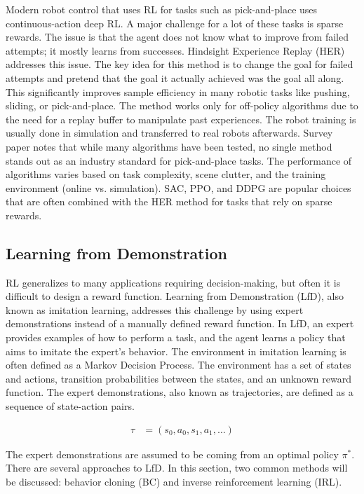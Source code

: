 \noindent
Modern robot control that uses RL for tasks such as pick-and-place uses continuous-action deep RL. A major challenge for a lot of these tasks is sparse rewards. The issue is that the agent does not know what to improve from failed attempts; it mostly learns from successes. Hindsight Experience Replay (HER) \cite{andrychowicz2018hindsightexperiencereplay} addresses this issue. The key idea for this method is to change the goal for failed attempts and pretend that the goal it actually achieved was the goal all along. This significantly improves sample efficiency in many robotic tasks like pushing, sliding, or pick-and-place. The method works only for off-policy algorithms due to the need for a replay buffer to manipulate past experiences. The robot training is usually done in simulation and transferred to real robots afterwards. Survey paper \cite{robotics10030105} notes that while many algorithms have been tested, no single method stands out as an industry standard for pick-and-place tasks. The performance of algorithms varies based on task complexity, scene clutter, and the training environment (online vs. simulation). SAC, PPO, and DDPG are popular choices that are often combined with the HER method for tasks that rely on sparse rewards.

\subsection{Learning from Demonstration}
RL generalizes to many applications requiring decision-making, but often it is difficult to design a reward function. Learning from Demonstration (LfD), also known as imitation learning, addresses this challenge by using expert demonstrations instead of a manually defined reward function. In LfD, an expert provides examples of how to perform a task, and the agent learns a policy that aims to imitate the expert's behavior. The environment in imitation learning is often defined as a Markov Decision Process. The environment has a set of states and actions, transition probabilities between the states, and an unknown reward function. The expert demonstrations, also known as trajectories, are defined as a sequence of state-action pairs. 

\begin{align}
\tau &= (s_0, a_0, s_1, a_1, \dots)
\end{align}

\noindent
The expert demonstrations are assumed to be coming from an optimal policy $\pi^*$. There are several approaches to LfD. In this section, two common methods will be discussed: behavior cloning (BC) and inverse reinforcement learning (IRL).

